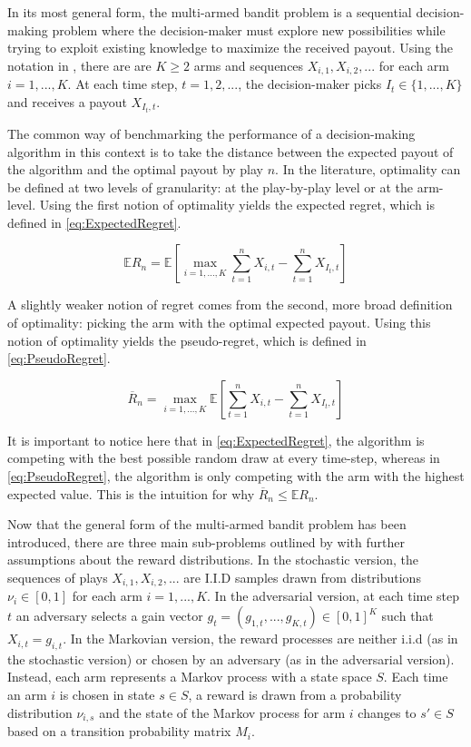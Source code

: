 In its most general form, the multi-armed bandit problem is a sequential decision-making problem where the decision-maker must explore new possibilities while trying to exploit existing knowledge to maximize the received payout. Using the notation in \cite{bubeck12}, there are are $K \geq{2}$ arms and sequences $X_{i, 1}, X_{i, 2}, ... $ for each arm $i = 1, ..., K$. At each time step, $t = 1, 2, ...$, the decision-maker picks $I_t \in \{1, ..., K\}$ and receives a payout $X_{I_t, t}$.

The common way of benchmarking the performance of a decision-making algorithm in this context is to take the distance between the expected payout of the algorithm and the optimal payout by play $n$. In the literature, optimality can be defined at two levels of granularity: at the play-by-play level or at the arm-level. Using the first notion of optimality yields the expected regret, which is defined in \autoref{eq:ExpectedRegret}.

\begin{equation}
\label{eq:ExpectedRegret}
\mathbb{E}R_n = \mathbb{E}\left[ \max_{i=1, ..., K}{\sum_{t=1}^{n}{X_{i, t}}} - \sum_{t=1}^{n}{X_{I_t, t}}\right]
\end{equation}

A slightly weaker notion of regret comes from the second, more broad definition of optimality: picking the arm with the optimal expected payout. Using this notion of optimality yields the pseudo-regret, which is defined in \autoref{eq:PseudoRegret}.

\begin{equation}
\label{eq:PseudoRegret}
\overline{R}_n = \max_{i=1, ..., K}\mathbb{E}\left[\sum_{t=1}^{n}{X_{i, t}} - \sum_{t=1}^{n}{X_{I_t, t}}\right]
\end{equation}

It is important to notice here that in \autoref{eq:ExpectedRegret}, the algorithm is competing with the best possible random draw at every time-step, whereas in \autoref{eq:PseudoRegret}, the algorithm is only competing with the arm with the highest expected value. This is the intuition for why $\overline{R}_n \leq{\mathbb{E}R_n}$.

Now that the general form of the multi-armed bandit problem has been introduced, there are three main sub-problems outlined by \cite{bubeck12} with further assumptions about the reward distributions. In the stochastic version, the sequences of plays $X_{i, 1}, X_{i, 2}, ... $ are I.I.D samples drawn from distributions $\nu_i \in [0, 1]$ for each arm $i = 1, ..., K$. In the adversarial version, at each time step $t$ an adversary selects a gain vector $g_t = (g_{1, t}, ..., g_{K, t}) \in [0, 1]^{K}$ such that $X_{i, t} = g_{i, t}$. In the Markovian version, the reward processes are neither i.i.d (as in the stochastic version) or chosen by an adversary (as in the adversarial version). Instead, each arm represents a Markov process with a state space $S$. Each time an arm $i$ is chosen in state $s \in{S}$, a reward is drawn from a probability distribution $\nu_{i, s}$ and the state of the Markov process for arm $i$ changes to $s' \in {S}$ based on a transition probability matrix $M_i$.

